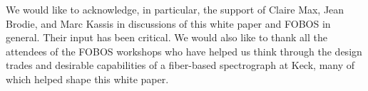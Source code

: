 \documentclass[11pt,letterpaper]{article}
\begin{document}
{\small
%
  We would like to acknowledge, in
particular, the support of Claire Max, Jean Brodie, and Marc Kassis in
discussions of this white paper and FOBOS in general.  Their input has
been critical.  We would also like to thank all the attendees of the
FOBOS workshops who have helped us think through the design trades and
desirable capabilities of a fiber-based spectrograph at Keck, many of
which helped shape this white paper.
%
}

%
%

%
%
\end{document}
